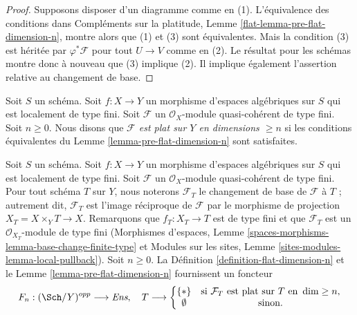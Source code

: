 \begin{proof}
Supposons disposer d'un diagramme comme en (1). L'équivalence des
conditions dans Compléments sur la platitude, Lemme \ref{flat-lemma-pre-flat-dimension-n},
montre alors que (1) et (3) sont équivalentes. Mais la condition (3) est héritée
par $\varphi^*\mathcal{F}$ pour tout $U \to V$ comme en (2).
Le résultat pour les schémas montre donc à nouveau que (3) implique (2).
Il implique également l'assertion relative au changement de base.
\end{proof}

\begin{definition}
\label{definition-flat-dimension-n}
Soit $S$ un schéma. Soit $f : X \to Y$ un morphisme d'espaces algébriques
sur $S$ qui est localement de type fini.
Soit $\mathcal{F}$ un $\mathcal{O}_X$-module quasi-cohérent de type fini.
Soit $n \geq 0$.
Nous disons que {\it $\mathcal{F}$ est plat sur $Y$ en dimensions $\geq n$}
si les conditions équivalentes du Lemme \ref{lemma-pre-flat-dimension-n}
sont satisfaites.
\end{definition}

\begin{situation}
\label{situation-flat-dimension-n}
Soit $S$ un schéma. Soit $f : X \to Y$ un morphisme d'espaces algébriques
sur $S$ qui est localement de type fini. Soit $\mathcal{F}$ un
$\mathcal{O}_X$-module quasi-cohérent de type fini. Pour tout schéma $T$ sur $Y$, nous
noterons $\mathcal{F}_T$ le changement de base de $\mathcal{F}$ à $T$ ; autrement dit,
$\mathcal{F}_T$ est l'image réciproque de $\mathcal{F}$ par le morphisme de projection
$X_T = X \times_Y T \to X$. Remarquons que $f_T : X_T \to T$ est de type fini
et que $\mathcal{F}_T$ est un $\mathcal{O}_{X_T}$-module de type fini
(Morphismes d'espaces, Lemme
\ref{spaces-morphisms-lemma-base-change-finite-type}
et
Modules sur les sites, Lemme \ref{sites-modules-lemma-local-pullback}).
Soit $n \geq 0$. La Définition \ref{definition-flat-dimension-n} et le
Lemme \ref{lemma-pre-flat-dimension-n} fournissent un foncteur
\begin{equation}
\label{equation-flat-dimension-n}
F_n : (\Sch/Y)^{opp} \longrightarrow \textit{Ens}, \quad
T \longrightarrow \left\{
\begin{matrix}
\{*\} & \text{si }\mathcal{F}_T\text{ est plat sur }T\text{ en }\dim \geq n, \\
\emptyset & \text{sinon.}
\end{matrix}
\right.
\end{equation}
\end{situation}

